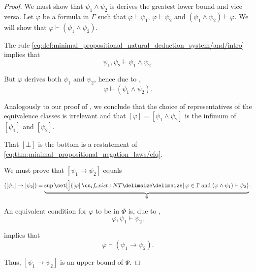 \begin{proof}
  We must show that \( \psi_1 \wedge \psi_2 \) is derives the greatest lower bound and vice versa. Let \( \varphi \) be a formula in \( \Gamma \) such that \( \varphi \vdash \psi_1 \), \( \varphi \vdash \psi_2 \) and \( (\psi_1 \wedge \psi_2) \vdash \varphi \). We will show that \( \varphi \vdash (\psi_1 \wedge \psi_2) \).

  The rule \eqref{eq:def:minimal_propositional_natural_deduction_system/and/intro} implies that
  \begin{equation*}
    \psi_1, \psi_2 \vdash \psi_1 \wedge \psi_2.
  \end{equation*}

  But \( \varphi \) derives both \( \psi_1 \) and \( \psi_2 \), hence due to ,
  \begin{equation*}
    \varphi \vdash (\psi_1 \wedge \psi_2).
  \end{equation*}

  Analogously to our proof of , we conclude that the choice of representatives of the equivalence classes is irrelevant and that \( [\varphi] = [\psi_1 \wedge \psi_2] \) is the infimum of \( [\psi_1] \) and \( [\psi_2] \).

   That \( [\bot] \) is the bottom is a restatement of \eqref{eq:thm:minimal_propositional_negation_laws/efq}.

   We must prove that \( [\psi_1 \rightarrow \psi_2] \) equals
  \begin{equation*}
    ([\psi_1] \rightarrow [\psi_2]) = \underbrace{\sup\set[\Big]{ [\varphi] \given* \varphi \in \Gamma \T{and} (\varphi \wedge \psi_1) \vdash \psi_2 }}_{\Phi}.
  \end{equation*}

  An equivalent condition for \( \varphi \) to be in \( \Phi \) is, due to ,
  \begin{equation*}
    \varphi, \psi_1 \vdash \psi_2.
  \end{equation*}

   implies that
  \begin{equation*}
    \varphi \vdash (\psi_1 \rightarrow \psi_2).
  \end{equation*}

  Thus, \( [\psi_1 \rightarrow \psi_2] \) is an upper bound of \( \Psi \).


\end{proof}
